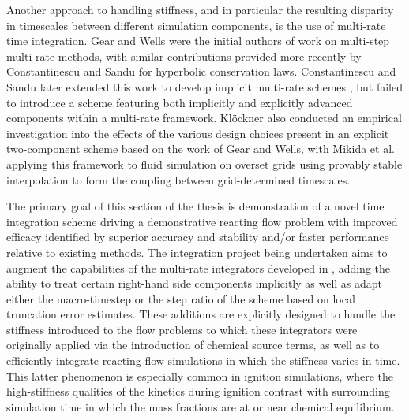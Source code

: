 Another approach to handling stiffness, and in particular the resulting disparity in
timescales between different simulation components, is the use of multi-rate
time integration. Gear and Wells \cite{gear1984multirate} were the initial authors of
work on multi-step multi-rate methods, with similar contributions provided more
recently by Constantinescu and Sandu \cite{constantinescu2007multirate} for hyperbolic
conservation laws. Constantinescu and Sandu later extended this work to develop implicit
multi-rate schemes \cite{constantinescu2010extrapolated,
constantinescu2013extrapolated}, but failed to introduce a scheme featuring both
implicitly and explicitly advanced components within a multi-rate framework. Kl\"{o}ckner
\cite{klockner2010high} also conducted an empirical investigation into the effects of the various design choices
present in an explicit two-component scheme based on the work of Gear and Wells, with Mikida et al.
\cite{mikida2019multi} applying this framework to fluid simulation on overset grids using provably stable
interpolation to form the coupling between grid-determined timescales.


The primary goal of this section of the thesis is demonstration of a novel
time integration scheme driving a demonstrative reacting flow problem
with improved efficacy identified by superior accuracy and stability and/or
faster performance relative to existing methods. The integration project
being undertaken aims to augment the capabilities of the multi-rate integrators
developed in \cite{mikida2019multi}, adding the ability to treat certain
right-hand side components implicitly as well as adapt either the macro-timestep
or the step ratio of the scheme based on local truncation error estimates. These
additions are explicitly designed to handle the stiffness introduced to the flow
problems to which these integrators were originally applied via the introduction
of chemical source terms, as well as to efficiently integrate reacting flow
simulations in which the stiffness varies in time. This latter phenomenon is especially
common in ignition simulations, where the high-stiffness qualities of the
kinetics during ignition contrast with surrounding simulation time in which
the mass fractions are at or near chemical equilibrium.

